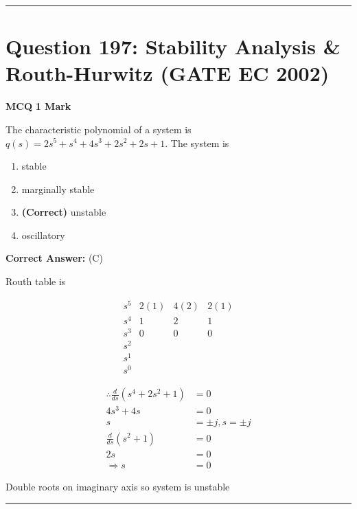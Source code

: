 \documentclass[11pt,a4paper]{article}
\begin{document}
\vspace{1.5em}
\hrule
\vspace{1.5em}

\section*{Question 197: Stability Analysis \& Routh-Hurwitz (GATE EC 2002)}
\noindent \textbf{\color{primary}MCQ} \hfill \textbf{\color{secondary}1 Mark}


\noindent The characteristic polynomial of a system is 
$q (s) = 2s^{5}+s^{4}+4s^{3}+2s^{2}+2s+1$. 
The system is


\begin{enumerate}[label=(\Alph*)]
    \item stable
    \item marginally stable
    \item \textbf{(Correct)} unstable
    \item oscillatory
\end{enumerate}

\noindent \textbf{Correct Answer:} (C)

\begin{tcolorbox}[solbox, title=Detailed Solution -- Question 197]
Routh table is

\[
\begin{array}{c|ccc} s^{5} & 2(1) & 4(2) & 2(1) \\ s^{4} & 1 & 2 & 1 \\ s^{3} & 0 & 0 & 0 \\ s^{2} & & & \\ s^{1} & & & \\ s^{0} & & & \end{array}
\]

\[
\begin{aligned} \therefore \frac{d}{d s}\left(s^{4}+2 s^{2}+1\right) &=0 \\ 4 s^{3}+4 s &=0 \\ s &=\pm j, s=\pm j \\ \frac{d}{d s}\left(s^{2}+1\right) &=0 \\ 2 s &=0 \\ \Rightarrow s &=0 \end{aligned}
\]

 Double roots on imaginary axis so system is unstable
\end{tcolorbox}

\vspace{1.5em}
\hrule
\vspace{1.5em}
\end{document}

